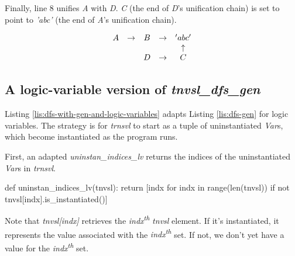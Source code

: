 Finally, line 8  unifies \textit{A} with \textit{D}. \textit{C} (the end of \textit{D}'s unification chain) is set to point to \textit{'abc'} (the end of \textit{A}'s unification chain). %

\begin{equation}\label{eq:three}
\begin{array}{c c c c c c c c c c c}
A & \to & B            & \to & 'abc'      \\ 
  &     &              &     & \uparrow   \\ 
  &     & D            & \to & C        
\end{array}
\end{equation}




\smallv
\subsection{A logic-variable version of \textit{tnvsl\_dfs\_gen}}
Listing \ref{lis:dfs-with-gen-and-logic-variables} adapts Listing \ref{lis:dfs-gen} for logic variables. The strategy is for \textit{trnsvl} to start as a tuple of uninstantiated \textit{Var}s, which become instantiated as the program runs.

First, an adapted \textit{uninstan\_indices\_lv} returns the indices of the uninstantiated \textit{Var}s in \textit{trnsvl}.
\begin{center}
\begin{minipage}[c]{0.45\textwidth}
\begin{python1}
def uninstan_indices_lv(tnvsl):
  return [indx for indx in range(len(tnvsl)) 
               if not tnvsl[indx].is_instantiated()]
\end{python1}
\end{minipage}
\end{center}

Note that \textit{tnvsl[indx]} retrieves the \textit{indx\textsuperscript{th}} \textit{tnvsl} element. If it's instantiated, it represents the value associated with the \textit{indx\textsuperscript{th}} set. If not, we don't yet have a value for the  \textit{indx\textsuperscript{th}} set.

